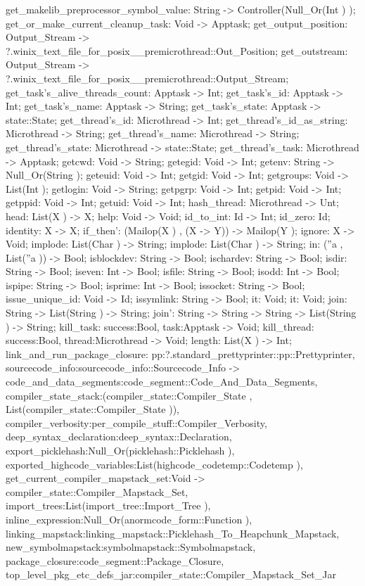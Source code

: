 get_makelib_preprocessor_symbol_value: String -> Controller(Null_Or(Int ) );
get_or_make_current_cleanup_task: Void -> Apptask;
get_output_position: Output_Stream -> ?.winix_text_file_for_posix__premicrothread::Out_Position;
get_outstream: Output_Stream -> ?.winix_text_file_for_posix__premicrothread::Output_Stream;
get_task's_alive_threads_count: Apptask -> Int;
get_task's_id: Apptask -> Int;
get_task's_name: Apptask -> String;
get_task's_state: Apptask -> state::State;
get_thread's_id: Microthread -> Int;
get_thread's_id_as_string: Microthread -> String;
get_thread's_name: Microthread -> String;
get_thread's_state: Microthread -> state::State;
get_thread's_task: Microthread -> Apptask;
getcwd: Void -> String;
getegid: Void -> Int;
getenv: String -> Null_Or(String );
geteuid: Void -> Int;
getgid: Void -> Int;
getgroups: Void -> List(Int );
getlogin: Void -> String;
getpgrp: Void -> Int;
getpid: Void -> Int;
getppid: Void -> Int;
getuid: Void -> Int;
hash_thread: Microthread -> Unt;
head: List(X ) -> X;
help: Void -> Void;
id_to_int: Id -> Int;
id_zero: Id;
identity: X -> X;
if_then': (Mailop(X ) , (X -> Y)) -> Mailop(Y );
ignore: X -> Void;
implode: List(Char ) -> String;
implode: List(Char ) -> String;
in: (''a , List(''a )) -> Bool;
isblockdev: String -> Bool;
ischardev: String -> Bool;
isdir: String -> Bool;
iseven: Int -> Bool;
isfile: String -> Bool;
isodd: Int -> Bool;
ispipe: String -> Bool;
isprime: Int -> Bool;
issocket: String -> Bool;
issue_unique_id: Void -> Id;
issymlink: String -> Bool;
it: Void;
it: Void;
join: String -> List(String ) -> String;
join': String -> String -> String -> List(String ) -> String;
kill_task: {success:Bool, task:Apptask} -> Void;
kill_thread: {success:Bool, thread:Microthread} -> Void;
length: List(X ) -> Int;
link_and_run_package_closure:
    {pp:?.standard_prettyprinter::pp::Prettyprinter, sourcecode_info:sourcecode_info::Sourcecode_Info}
    ->  {code_and_data_segments:code_segment::Code_And_Data_Segments,
        compiler_state_stack:(compiler_state::Compiler_State , List(compiler_state::Compiler_State )),
        compiler_verbosity:per_compile_stuff::Compiler_Verbosity,
        deep_syntax_declaration:deep_syntax::Declaration,
        export_picklehash:Null_Or(picklehash::Picklehash ),
        exported_highcode_variables:List(highcode_codetemp::Codetemp ),
        get_current_compiler_mapstack_set:Void -> compiler_state::Compiler_Mapstack_Set,
        import_trees:List(import_tree::Import_Tree ), inline_expression:Null_Or(anormcode_form::Function ),
        linking_mapstack:linking_mapstack::Picklehash_To_Heapchunk_Mapstack,
        new_symbolmapstack:symbolmapstack::Symbolmapstack, package_closure:code_segment::Package_Closure,
        top_level_pkg_etc_defs_jar:compiler_state::Compiler_Mapstack_Set_Jar}
